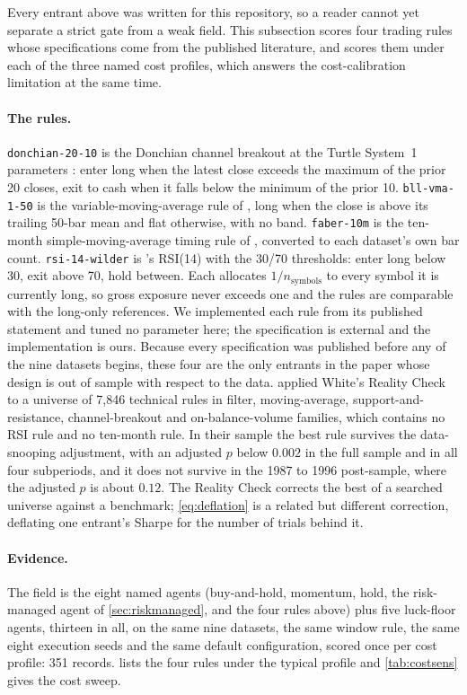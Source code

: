 Every entrant above was written for this repository, so a reader cannot yet separate a strict gate from a weak field. This subsection scores four trading rules whose specifications come from the published literature, and scores them under each of the three named cost profiles, which answers the cost-calibration limitation at the same time.

\paragraph{The rules.} \texttt{donchian-20-10} is the Donchian channel breakout at the Turtle System~1 parameters \citep{faith2007turtle}: enter long when the latest close exceeds the maximum of the prior 20 closes, exit to cash when it falls below the minimum of the prior 10. \texttt{bll-vma-1-50} is the variable-moving-average rule of \citet{brock1992simple}, long when the close is above its trailing 50-bar mean and flat otherwise, with no band. \texttt{faber-10m} is the ten-month simple-moving-average timing rule of \citet{faber2007quantitative}, converted to each dataset's own bar count. \texttt{rsi-14-wilder} is \citet{wilder1978new}'s RSI(14) with the 30/70 thresholds: enter long below 30, exit above 70, hold between. Each allocates $1/n_{\text{symbols}}$ to every symbol it is currently long, so gross exposure never exceeds one and the rules are comparable with the long-only references. We implemented each rule from its published statement and tuned no parameter here; the specification is external and the implementation is ours. Because every specification was published before any of the nine datasets begins, these four are the only entrants in the paper whose design is out of sample with respect to the data. \citet{sullivan1999datasnooping} applied White's Reality Check to a universe of 7{,}846 technical rules in filter, moving-average, support-and-resistance, channel-breakout and on-balance-volume families, which contains no RSI rule and no ten-month rule. In their sample the best rule survives the data-snooping adjustment, with an adjusted $p$ below $0.002$ in the full sample and in all four subperiods, and it does not survive in the 1987 to 1996 post-sample, where the adjusted $p$ is about $0.12$. The Reality Check corrects the best of a searched universe against a benchmark; \cref{eq:deflation} is a related but different correction, deflating one entrant's Sharpe for the number of trials behind it.

\paragraph{Evidence.} The field is the eight named agents (buy-and-hold, momentum, hold, the risk-managed agent of \cref{sec:riskmanaged}, and the four rules above) plus five luck-floor agents, thirteen in all, on the same nine datasets, the same window rule, the same eight execution seeds and the same default configuration, scored once per cost profile: 351 records.  lists the four rules under the typical profile and \cref{tab:costsens} gives the cost sweep.

